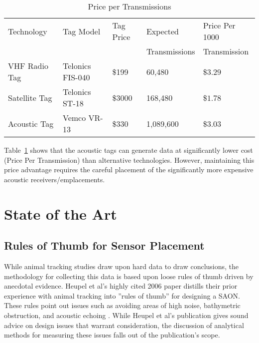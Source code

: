 \begin{table}[ht]
	\begin{tabular}{l l l l l}
		Technology&Tag Model&Tag Price&Expected&Price Per 1000\\
		&&&Transmissions&Transmission\\
		\hline
		VHF Radio Tag		& Telonics FIS-040	& \$199		& 60,480	& \$$3.29$\\
		Satellite Tag		& Telonics ST-18	& \$3000	& 168,480	& \$$1.78$\\
		Acoustic Tag		& Vemco VR-13		& \$330		& 1,089,600	& \$$3.03$\\
	\end{tabular}
	\caption{Price per Transmissions
		\label{PricePerTx}}
\end{table}

Table~\ref{PricePerTx} shows that the acoustic tags can generate data at significantly lower cost (Price Per Transmission) than alternative technologies.  However, maintaining this price advantage requires the careful placement of the significantly more expensive acoustic receivers/emplacements.  






\section{State of the Art}

\subsection{Rules of Thumb for Sensor Placement}
\label{RulesOfThumb}
While animal tracking studies draw upon hard data to draw conclusions, the methodology for collecting this data is based upon loose rules of thumb driven by anecdotal evidence.  Heupel et al's highly cited 2006 paper distills their prior experience with animal tracking into ''rules of thumb'' for designing a SAON.  These rules point out issues such as avoiding areas of high noise, bathymetric obstruction, and acoustic echoing \cite{Heupel2006}.  While Heupel et al's publication gives sound advice on design issues that warrant consideration, the discussion of analytical methods for measuring these issues falls out of the publication's scope.



